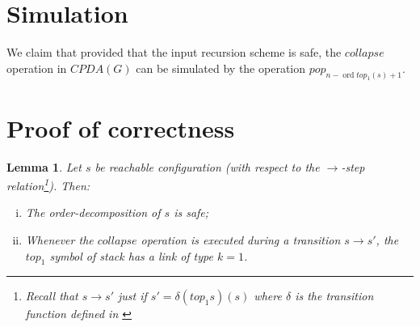 \documentclass{article}
\newcommand{\ord}{\mathop{\mathrm{ord}}}
\newtheorem{lemma}{Lemma}[section]
\theoremstyle{remark}
\theoremstyle{definition}
\begin{document}
\section{Simulation}

We claim that provided that the input recursion scheme is safe, the $collapse$ operation
in $CPDA(G)$ can be simulated by the operation $pop_{n-\ord{top_1(s)}+1}$.

\section{Proof of correctness}

\begin{lemma}
Let $s$ be reachable configuration (with respect to the
$\rightarrow$-step relation\footnote{Recall that $s\rightarrow s'$
just if $s' = \delta(top_1 s)(s)$ where $\delta$ is the transition
function defined in \cite[Figure 2]{hague-sto07}}). Then:
\begin{enumerate}[i.]
\item The order-decomposition of $s$ is safe;
\item Whenever the $collapse$ operation is executed during a
transition $s \rightarrow s'$, the $top_1$ symbol of stack has a
link of type $k=1$.
\end{enumerate}
\end{lemma}
\end{document}
